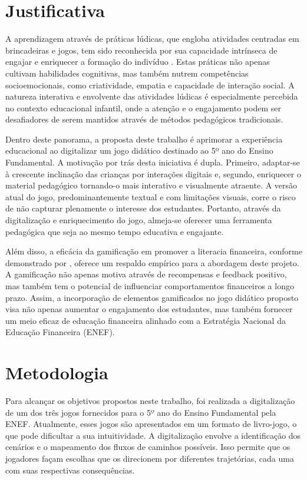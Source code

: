 \section{Justificativa}

A aprendizagem através de práticas lúdicas, que engloba atividades centradas em brincadeiras e jogos, tem sido reconhecida por sua capacidade intrínseca de engajar e enriquecer a formação do indivíduo \cite{Santos_Thayna_da_silva_2021}. Estas práticas não apenas cultivam habilidades cognitivas, mas também nutrem competências socioemocionais, como criatividade, empatia e capacidade de interação social. A natureza interativa e envolvente das atividades lúdicas é especialmente percebida no contexto educacional infantil, onde a atenção e o engajamento podem ser desafiadores de serem mantidos através de métodos pedagógicos tradicionais.

Dentro deste panorama, a proposta deste trabalho é aprimorar a experiência educacional ao digitalizar um jogo didático destinado ao 5º ano do Ensino Fundamental. A motivação por trás desta iniciativa é dupla. Primeiro, adaptar-se à crescente inclinação das crianças por interações digitais e, segundo, enriquecer o material pedagógico tornando-o mais interativo e visualmente atraente. A versão atual do jogo, predominantemente textual e com limitações visuais, corre o risco de não capturar plenamente o interesse dos estudantes. Portanto, através da digitalização e enriquecimento do jogo, almeja-se oferecer uma ferramenta pedagógica que seja ao mesmo tempo educativa e engajante.

Além disso, a eficácia da gamificação em promover a literacia financeira, conforme demonstrado por \cite{inchamnan2019gamification}, oferece um respaldo empírico para a abordagem deste projeto. A gamificação não apenas motiva através de recompensas e feedback positivo, mas também tem o potencial de influenciar comportamentos financeiros a longo prazo. Assim, a incorporação de elementos gamificados no jogo didático proposto visa não apenas aumentar o engajamento dos estudantes, mas também fornecer um meio eficaz de educação financeira alinhado com a Estratégia Nacional da Educação Financeira (ENEF).


\section{Metodologia}

Para alcançar os objetivos propostos neste trabalho, foi realizada a digitalização de um dos três jogos fornecidos para o 5º ano do Ensino Fundamental pela ENEF. Atualmente, esses jogos são apresentados em um formato de livro-jogo, o que pode dificultar a sua intuitividade. A digitalização envolve a identificação dos cenários e o mapeamento dos fluxos de caminhos possíveis. Isso permite que os jogadores façam escolhas que os direcionem por diferentes trajetórias, cada uma com suas respectivas consequências.

